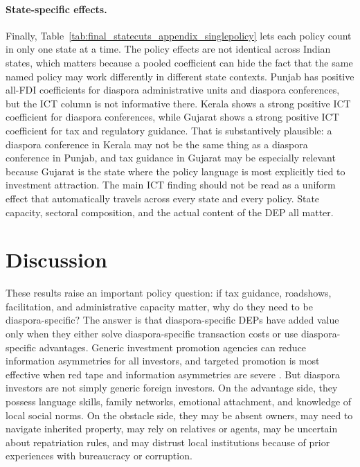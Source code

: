 \documentclass[12pt]{article}
\begin{document}
\paragraph{State-specific effects.} Finally, Table~\ref{tab:final_statecuts_appendix_singlepolicy} lets each policy count in only one state at a time. The policy effects are not identical across Indian states, which matters because a pooled coefficient can hide the fact that the same named policy may work differently in different state contexts. Punjab has positive all-FDI coefficients for diaspora administrative units and diaspora conferences, but the ICT column is not informative there. Kerala shows a strong positive ICT coefficient for diaspora conferences, while Gujarat shows a strong positive ICT coefficient for tax and regulatory guidance. That is substantively plausible: a diaspora conference in Kerala may not be the same thing as a diaspora conference in Punjab, and tax guidance in Gujarat may be especially relevant because Gujarat is the state where the policy language is most explicitly tied to investment attraction. The main ICT finding should not be read as a uniform effect that automatically travels across every state and every policy. State capacity, sectoral composition, and the actual content of the DEP all matter.



\section{Discussion} \label{sec:discussion}

These results raise an important policy question: if tax guidance, roadshows, facilitation, and administrative capacity matter, why do they need to be diaspora-specific? The answer is that diaspora-specific DEPs have added value only when they either solve diaspora-specific transaction costs or use diaspora-specific advantages. Generic investment promotion agencies can reduce information asymmetries for all investors, and targeted promotion is most effective when red tape and information asymmetries are severe \citep{harding_roll_2011}. But diaspora investors are not simply generic foreign investors. On the advantage side, they possess language skills, family networks, emotional attachment, and knowledge of local social norms. On the obstacle side, they may be absent owners, may need to navigate inherited property, may rely on relatives or agents, may be uncertain about repatriation rules, and may distrust local institutions because of prior experiences with bureaucracy or corruption.
\end{document}

